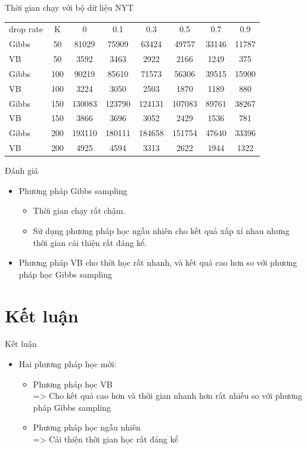 \documentclass[pdf]{beamer}
\begin{document}
\begin{frame}{Thời gian chạy với bộ dữ liệu NYT}
\begin{tabular}{l|c |c | c | c | c | c | c }
	drop rate & K & 0  & 0.1 & 0.3 & 0.5 & 0.7 & 0.9 \\
	\arrayrulecolor{blue}\hline \hline
	\arrayrulecolor{black}
	Gibbs &50 & 81029& 75909 & 63424 & 49757 & 33146 & 11787 \\ 
	VB &50 & 3592& 3463 & 2922 & 2166 &1249 & 375 \\
	\arrayrulecolor{blue}\hline \hline
	\arrayrulecolor{black}
	Gibbs &100 &90219 & 85610 & 71573 & 56306 & 39515&  15900\\ 
	VB &100 &3224 & 3050 & 2503 & 1870 &1189 &880\\
	\arrayrulecolor{blue}\hline \hline
	\arrayrulecolor{black}
	Gibbs &150 &130083 & 123790 & 124131 & 107083& 89761& 38267 \\ 
	VB &150 &3866 & 3696 & 3052 & 2429 &1536 &781\\
	\arrayrulecolor{blue}\hline \hline
	\arrayrulecolor{black}
	Gibbs &200 & 193110& 180111 & 184658 & 151754 & 47640 & 33396 \\ 
	VB &200 &4925 & 4594 & 3313 & 2622 & 1944&1322
\end{tabular}
\end{frame}

\begin{frame}{Đánh giá}
	\begin{itemize}
		\item Phương pháp Gibbs sampling
		\begin{itemize}
			\item Thời gian chạy rất chậm.
			\item Sử dụng phương pháp học ngẫu nhiên cho kết quả xấp xỉ nhau nhưng thời gian cải thiện rất đáng kể.
		\end{itemize}
		\item Phương pháp VB cho thời học rất nhanh, và kết quả cao hơn so với phương pháp học Gibbs sampling
	\end{itemize}
\end{frame}
\section{Kết luận}
	\begin{frame}{Kết luận}
		\begin{itemize}
			\item Hai phương pháp học mới:
			\begin{itemize}
				\item Phương pháp học VB \\=> Cho kết quả cao hơn và thời gian nhanh hơn rất nhiều so với  phương pháp Gibbs sampling
				\item Phương pháp học ngẫu nhiên \\=> Cải thiện thời gian học rất đáng kể
			\end{itemize}
		\end{itemize}
	\end{frame}
\end{document}
